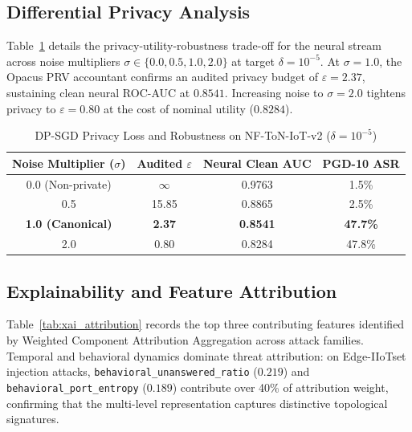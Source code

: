 \documentclass[10pt,journal,compsoc,twocolumn]{IEEEtran}
\begin{document}
\subsection{Differential Privacy Analysis}
Table~\ref{tab:dp_analysis} details the privacy-utility-robustness trade-off for the neural stream across noise multipliers $\sigma \in \{0.0, 0.5, 1.0, 2.0\}$ at target $\delta = 10^{-5}$. At $\sigma=1.0$, the Opacus PRV accountant confirms an audited privacy budget of $\varepsilon = 2.37$, sustaining clean neural ROC-AUC at $0.8541$. Increasing noise to $\sigma=2.0$ tightens privacy to $\varepsilon = 0.80$ at the cost of nominal utility ($0.8284$).

\begin{table}[htbp]
\caption{DP-SGD Privacy Loss and Robustness on NF-ToN-IoT-v2 ($\delta=10^{-5}$)}
\label{tab:dp_analysis}
\centering
\begin{tabular}{cccc}
\toprule
\textbf{Noise Multiplier ($\sigma$)} & \textbf{Audited $\varepsilon$} & \textbf{Neural Clean AUC} & \textbf{PGD-10 ASR} \\
\midrule
0.0 (Non-private) & $\infty$ & 0.9763 & 1.5\% \\
0.5 & 15.85 & 0.8865 & 2.5\% \\
\textbf{1.0 (Canonical)} & \textbf{2.37} & \textbf{0.8541} & \textbf{47.7\%} \\
2.0 & 0.80 & 0.8284 & 47.8\% \\
\bottomrule
\end{tabular}
\end{table}

\subsection{Explainability and Feature Attribution}
Table~\ref{tab:xai_attribution} records the top three contributing features identified by Weighted Component Attribution Aggregation across attack families. Temporal and behavioral dynamics dominate threat attribution: on Edge-IIoTset injection attacks, \texttt{behavioral\_unanswered\_ratio} ($0.219$) and \texttt{behavioral\_port\_entropy} ($0.189$) contribute over 40\% of attribution weight, confirming that the multi-level representation captures distinctive topological signatures.
\end{document}
